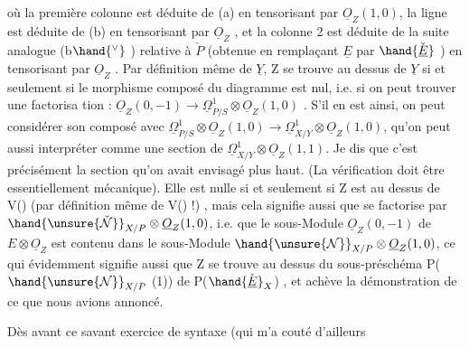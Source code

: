 

où la première colonne est déduite de (a) en tensorisant par $\underline{O}_Z(1,0)$,
la ligne est déduite de  (b) en tensorisant par $\underline{O}_Z$  , et la colonne 2
est déduite  de la  suite analogue  (b$\hand{^\vee}$ ) relative à $\check{P}$  (obtenue
en remplaçant $\underline{E}$ par $\hand{\check{\underline{E}}}$ )  en tensorisant par $\underline{O}_Z$ . Par définition même
de $\underline{Y}$, Z se trouve au dessus de $\underline{Y}$  si et seulement si le morphisme
composé \hand{$\alpha$} du diagramme est nul, i.e.  si on peut trouver une  factorisa
tion \hand{$\beta$}: $\underline{O}_Z(0,-1) \rightarrow \underline{\Omega}^1_{P/S}\otimes \underline{O}_Z(1,0)$ .  S'il en est ainsi, on  peut
considérer  son composé avec  $\underline{\Omega}^1_{P/S} \otimes \underline{O}_Z(1,0) \rightarrow \underline{\Omega}^1_{X/Y} \otimes \underline{O}_Z(1,0)$,
qu'on peut aussi interpréter comme une section de $\underline{\Omega}^1_{X/Y}\otimes \underline{O}_Z(1,1)$.
Je dis que c'est précisément la section \inserted{$\unsure{\nu|\mu}$} qu'on avait envisagé plus haut.
(La vérification doit être essentiellement mécanique).  Elle est
nulle  si et seulement si  Z est au dessus de V(\hand{$\unsure{\nu|\mu}$})  (par définition
même de V(\hand{$\unsure{\nu|\mu}$}) !) , mais cela signifie aussi  que \hand{$\beta$} se factorise par
$\hand{\unsure{\check{\mathcal{N}}}}_{X/P} \otimes \underline{O}_Z(1,0)$, i.e. que  le sous-Module $\underline{O}_Z(0,-1)$ de $E\otimes \underline{O}_Z$ est contenu
dans le sous-Module $\hand{\unsure{\mathcal{N}}}_{X/P} \otimes \underline{O}_Z(1,0)$,  ce qui évidemment signifie aussi
que  Z se trouve au dessus du sous-préschéma  P( $\hand{\unsure{\mathcal{N}}}_{X/P}$ (1)) de P($\hand{\check{\underline{E}}}_X$) , et
achève la démonstration de ce que nous avions annoncé.

Dès avant ce savant exercice de syntaxe (qui m'a couté d'ailleurs

